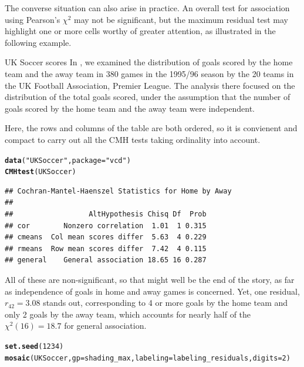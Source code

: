 \documentclass[11pt]{book}\usepackage[]{graphicx}\usepackage[]{color}
\makeatletter
\newcommand{\hlnum}[1]{\textcolor[rgb]{0.686,0.059,0.569}{#1}}%
\newcommand{\hlstr}[1]{\textcolor[rgb]{0.192,0.494,0.8}{#1}}%
\newcommand{\hlstd}[1]{\textcolor[rgb]{0.345,0.345,0.345}{#1}}%
\newcommand{\hlkwc}[1]{\textcolor[rgb]{0.333,0.667,0.333}{#1}}%
\newcommand{\hlkwd}[1]{\textcolor[rgb]{0.737,0.353,0.396}{\textbf{#1}}}%
\newenvironment{kframe}{%
 \def\at@end@of@kframe{}%
 \ifinner\ifhmode%
  \def\at@end@of@kframe{\end{minipage}}%
  \begin{minipage}{\columnwidth}%
 \fi\fi%
 \def\FrameCommand##1{\hskip\@totalleftmargin \hskip-\fboxsep
 \colorbox{shadecolor}{##1}\hskip-\fboxsep
     \hskip-\linewidth \hskip-\@totalleftmargin \hskip\columnwidth}%
 \MakeFramed {\advance\hsize-\width
   \@totalleftmargin\z@ \linewidth\hsize
   \@setminipage}}%
 {\par\unskip\endMakeFramed%
 \at@end@of@kframe}
\newenvironment{knitrout}{}{} %
\renewenvironment{knitrout}{\small\renewcommand{\baselinestretch}{.85}}{} %
\makeatother
\begin{document}
The converse situation can also arise in practice. An overall test for association
using Pearson's $\chi^2$ may not be significant, but the maximum residual test
may highlight one or more cells worthy of greater attention, as illustrated in
the following example.


\begin{Example}[soccer2]{UK Soccer scores}
In , we examined the distribution of goals scored
by the home team and the away team in 380 games in the 1995/96 season
by the 20 teams in the UK Football Association, Premier League.
The analysis there focused on the distribution of the total goals
scored, under the assumption that the number of goals scored by
the home team and the away team were independent.

Here, the rows and columns of the table  are both ordered,
so it is convienent and compact to carry out all the CMH tests taking
ordinality into account.
\begin{knitrout}
\color{fgcolor}\begin{kframe}
\begin{alltt}
\hlkwd{data}\hlstd{(}\hlstr{"UKSoccer"}\hlstd{,} \hlkwc{package}\hlstd{=}\hlstr{"vcd"}\hlstd{)}
\hlkwd{CMHtest}\hlstd{(UKSoccer)}
\end{alltt}
\begin{verbatim}
## Cochran-Mantel-Haenszel Statistics for Home by Away 
## 
##                  AltHypothesis Chisq Df  Prob
## cor        Nonzero correlation  1.01  1 0.315
## cmeans  Col mean scores differ  5.63  4 0.229
## rmeans  Row mean scores differ  7.42  4 0.115
## general    General association 18.65 16 0.287
\end{verbatim}
\end{kframe}
\end{knitrout}

All of these are non-significant, so that might well be the end of the story,
as far as independence of goals in home and away games is concerned. Yet, one
residual, $r_{42} = 3.08$ stands out, corresponding to 4 or more goals by
the home team and only 2 goals by the away team, which accounts for nearly
half of the $\chi^2 (16) = 18.7$ for general association.

\begin{knitrout}
\color{fgcolor}\begin{kframe}
\begin{alltt}
\hlkwd{set.seed}\hlstd{(}\hlnum{1234}\hlstd{)}
\hlkwd{mosaic}\hlstd{(UKSoccer,} \hlkwc{gp}\hlstd{=shading_max,} \hlkwc{labeling}\hlstd{=labeling_residuals,} \hlkwc{digits}\hlstd{=}\hlnum{2}\hlstd{)}
\end{alltt}
\end{kframe}\begin{figure}[htbp]



\end{figure}
\end{knitrout}
\end{Example}
\end{document}

